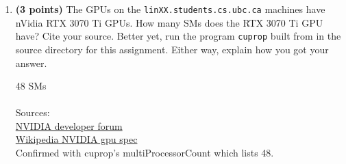 \documentclass{article}
\newcommand{\Henon}{H\'{e}non}
\newcommand{\gpumodel}{RTX 3070 Ti}
\newenvironment{answer}
{\par\color{blue}}
{\normalfont\par}
\begin{document}
\begin{enumerate}
\begin{enumerate}
\begin{itemize}
                              to figure out what you need.
                        \item Likewise, you will need to check to make sure that the index for this thread is in bounds.
                              Again, you can look the kernels in
                              to see examples.
                        \item The GPU and CPU versions won't produce the exact same answers, because C (running on the x86)
                              converts all s to s when doing arithmetic, and then rounds the final
                              value when assigning to a .  The GPU code does everything with s if
                              the operands are s.  The rounding error makes the two sequences of points diverge
                              because the \Henon{} map is chaotic.  The good news is that both versions converge to the
                              same estimates of RMS step size and variance.
                              I might find some other ways you can test your code -- or you can.
                    \end{itemize}
              \item \textbf{(3 points)}
                    The GPUs on the \texttt{linXX.students.cs.ubc.ca} machines have nVidia \gpumodel{} GPUs.
                    How many SMs does the \gpumodel{} GPU have?  Cite your source.  Better yet,
                    run the program \texttt{cuprop} built from  in the source
                    directory for this assignment.  Either way, explain how you got your answer.
                    \begin{answer}
                        48 SMs \\ \\
                        Sources: \\
                        \href{https://forums.developer.nvidia.com/t/how-much-sms-of-gtx-3070/217134}{NVIDIA developer forum} \\
                        \href{https://en.wikipedia.org/wiki/List_of_Nvidia_graphics_processing_units}{Wikipedia NVIDIA gpu spec} \\
                        Confirmed with cuprop's multiProcessorCount which lists 48.

\end{answer}
\end{enumerate}
\end{enumerate}
\end{document}
